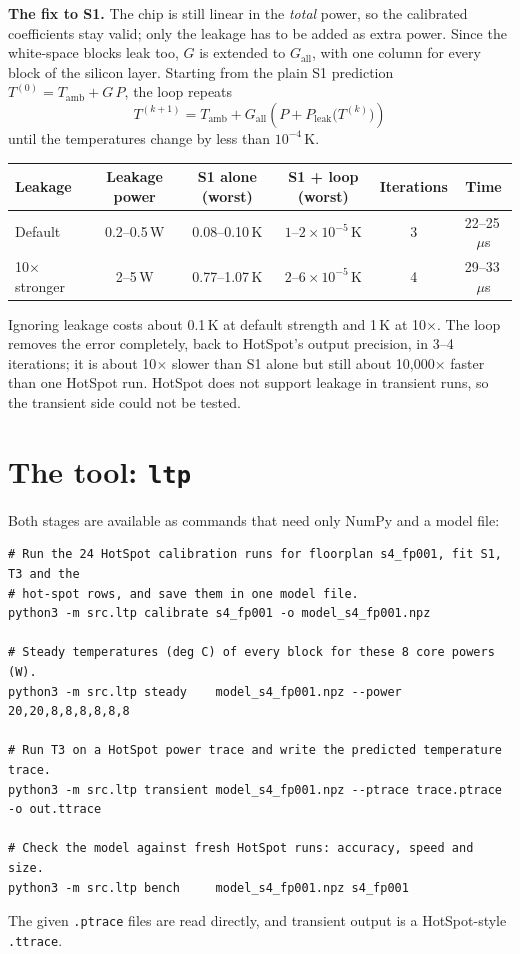\documentclass[11pt,a4paper]{article}
\newcommand{\us}{\,$\mu$s}
\begin{document}
\textbf{The fix to S1.} The chip is still linear in the \emph{total} power, so the calibrated
coefficients stay valid; only the leakage has to be added as extra power. Since the white-space
blocks leak too, $G$ is extended to $G_\text{all}$, with one column for every block of the silicon
layer. Starting from the plain S1
prediction $T^{(0)} = T_\text{amb} + G\,P$, the loop repeats
\begin{equation}
  T^{(k+1)} = T_\text{amb} + G_\text{all}\left(P + P_\text{leak}\big(T^{(k)}\big)\right)
  \label{eq:leakloop}
\end{equation}
until the temperatures change by less than $10^{-4}$\,K.

\begin{center}
\small
\begin{tabular}{@{}l c c c c c@{}}
\toprule
Leakage & Leakage power & S1 alone (worst) & S1 + loop (worst) & Iterations & Time \\
\midrule
Default & 0.2--0.5\,W & 0.08--0.10\,K & $1$--$2\times10^{-5}$\,K & 3 & 22--25\us \\
10$\times$ stronger & 2--5\,W & 0.77--1.07\,K & $2$--$6\times10^{-5}$\,K & 4 & 29--33\us \\
\bottomrule
\end{tabular}
\end{center}
Ignoring leakage costs about 0.1\,K at default strength and 1\,K at 10$\times$. The loop removes
the error completely, back to HotSpot's output precision, in 3--4 iterations; it is about
10$\times$ slower than S1 alone but still about 10{,}000$\times$ faster than one HotSpot run.
HotSpot does not support leakage in transient runs, so the transient side could not be tested.

\section{The tool: \texttt{ltp}}
Both stages are available as commands that need only NumPy and a model file:
{\small\begin{verbatim}
# Run the 24 HotSpot calibration runs for floorplan s4_fp001, fit S1, T3 and the
# hot-spot rows, and save them in one model file.
python3 -m src.ltp calibrate s4_fp001 -o model_s4_fp001.npz

# Steady temperatures (deg C) of every block for these 8 core powers (W).
python3 -m src.ltp steady    model_s4_fp001.npz --power 20,20,8,8,8,8,8,8

# Run T3 on a HotSpot power trace and write the predicted temperature trace.
python3 -m src.ltp transient model_s4_fp001.npz --ptrace trace.ptrace -o out.ttrace

# Check the model against fresh HotSpot runs: accuracy, speed and size.
python3 -m src.ltp bench     model_s4_fp001.npz s4_fp001
\end{verbatim}}
The given \texttt{.ptrace} files are read directly, and transient output is a HotSpot-style
\texttt{.ttrace}.
\end{document}
